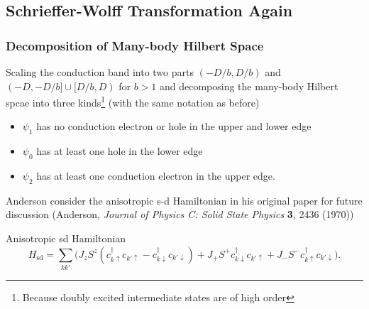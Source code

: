 \documentclass[10pt,aspectratio=43,xcolor=x11names,t]{beamer}%
\begin{document}
	\subsection{Schrieffer-Wolff Transformation Again}
		\begin{frame}\frametitle{Decomposition of Many-body Hilbert Space}
			Scaling the conduction band into two parts $(-D/b,D/b)$ and $(-D,-D/b]\cup[D/b,D)$ for $b>1$ and decomposing the many-body Hilbert spcae into three kinds\footnote{Because doubly excited intermediate states are of high order} (with the same notation as before)
			\begin{itemize}
				\item $\psi_1$ has no conduction electron or hole in the upper and lower edge
				\item $\psi_0$ has at least one hole in the lower edge
				\item $\psi_2$ has at least one conduction electron in the upper edge.
			\end{itemize}
			\pause
			Anderson consider the {\color{blue}anisotropic} s-d Hamiltonian in his original paper for future discussion (Anderson, \textit{Journal of Physics C: Solid State Physics} \textbf{3}, 2436 (1970))
			\begin{block}{Anisotropic sd Hamiltonian}
				\begin{equation*}
					H_{\text{sd}}=\sum_{kk'}\bigg(J_zS^z(c_{k\uparrow}^\dagger c_{k'\uparrow}-c_{k\downarrow}^\dagger c_{k'\downarrow})+J_+S^+c_{k\downarrow}^\dagger c_{k'\uparrow}+J_-S^-c_{k\uparrow}^\dagger c_{k'\downarrow}\bigg).
				\end{equation*}
			\end{block}
		\end{frame}
\end{document}
